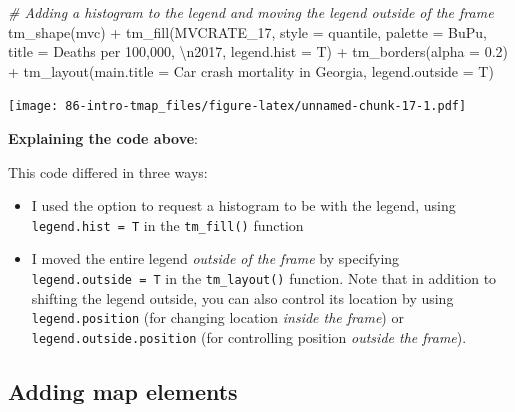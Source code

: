 \documentclass[
]{book}
\newenvironment{Shaded}{\begin{snugshade}}{\end{snugshade}}
\newcommand{\AttributeTok}[1]{\textcolor[rgb]{0.77,0.63,0.00}{#1}}
\newcommand{\CommentTok}[1]{\textcolor[rgb]{0.56,0.35,0.01}{\textit{#1}}}
\newcommand{\FloatTok}[1]{\textcolor[rgb]{0.00,0.00,0.81}{#1}}
\newcommand{\FunctionTok}[1]{\textcolor[rgb]{0.00,0.00,0.00}{#1}}
\newcommand{\NormalTok}[1]{#1}
\newcommand{\SpecialCharTok}[1]{\textcolor[rgb]{0.00,0.00,0.00}{#1}}
\newcommand{\StringTok}[1]{\textcolor[rgb]{0.31,0.60,0.02}{#1}}
\providecommand{\tightlist}{%
  \setlength{\itemsep}{0pt}\setlength{\parskip}{0pt}}
\begin{document}
\begin{Shaded}
\begin{Highlighting}[]
\CommentTok{\# Adding a histogram to the legend and moving the legend outside of the frame}
\FunctionTok{tm\_shape}\NormalTok{(mvc) }\SpecialCharTok{+}
  \FunctionTok{tm\_fill}\NormalTok{(}\StringTok{\textquotesingle{}MVCRATE\_17\textquotesingle{}}\NormalTok{,}
          \AttributeTok{style =} \StringTok{\textquotesingle{}quantile\textquotesingle{}}\NormalTok{,}
          \AttributeTok{palette =} \StringTok{\textquotesingle{}BuPu\textquotesingle{}}\NormalTok{,}
          \AttributeTok{title =} \StringTok{\textquotesingle{}Deaths per 100,000, }\SpecialCharTok{\textbackslash{}n}\StringTok{2017\textquotesingle{}}\NormalTok{,}
          \AttributeTok{legend.hist =}\NormalTok{ T) }\SpecialCharTok{+}
  \FunctionTok{tm\_borders}\NormalTok{(}\AttributeTok{alpha =} \FloatTok{0.2}\NormalTok{) }\SpecialCharTok{+}
  \FunctionTok{tm\_layout}\NormalTok{(}\AttributeTok{main.title =} \StringTok{\textquotesingle{}Car crash mortality in Georgia\textquotesingle{}}\NormalTok{,}
            \AttributeTok{legend.outside =}\NormalTok{ T)}
\end{Highlighting}
\end{Shaded}

\texttt{[image: 86-intro-tmap\_files/figure-latex/unnamed-chunk-17-1.pdf]}

\textbf{Explaining the code above}:

This code differed in three ways:

\begin{itemize}
\tightlist
\item
  I used the option to request a histogram to be with the legend, using \texttt{legend.hist\ =\ T} in the \texttt{tm\_fill()} function
\item
  I moved the entire legend \emph{outside of the frame} by specifying \texttt{legend.outside\ =\ T} in the \texttt{tm\_layout()} function. Note that in addition to shifting the legend outside, you can also control its location by using \texttt{legend.position} (for changing location \emph{inside the frame}) or \texttt{legend.outside.position} (for controlling position \emph{outside the frame}).
\end{itemize}

\hypertarget{adding-map-elements}{%
\subsection{Adding map elements}\label{adding-map-elements}}
\end{document}
